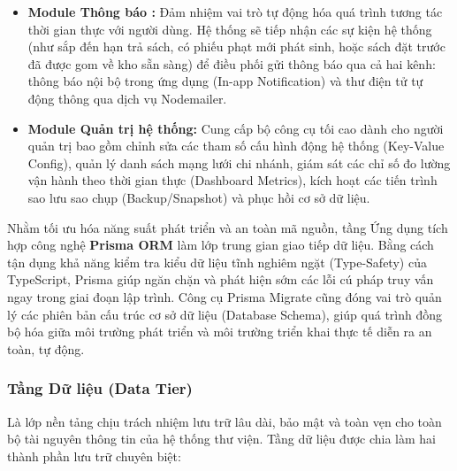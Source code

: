 \begin{itemize}
    \item \textbf{Module Thông báo :} Đảm nhiệm vai trò tự động hóa quá trình tương tác thời gian thực với người dùng. Hệ thống sẽ tiếp nhận các sự kiện hệ thống (như sắp đến hạn trả sách, có phiếu phạt mới phát sinh, hoặc sách đặt trước đã được gom về kho sẵn sàng) để điều phối gửi thông báo qua cả hai kênh: thông báo nội bộ trong ứng dụng (In-app Notification) và thư điện tử tự động thông qua dịch vụ Nodemailer.
    
    \item \textbf{Module Quản trị hệ thống:} Cung cấp bộ công cụ tối cao dành cho người quản trị bao gồm chỉnh sửa các tham số cấu hình động hệ thống (Key-Value Config), quản lý danh sách mạng lưới chi nhánh, giám sát các chỉ số đo lường vận hành theo thời gian thực (Dashboard Metrics), kích hoạt các tiến trình sao lưu sao chụp (Backup/Snapshot) và phục hồi cơ sở dữ liệu.
\end{itemize}

Nhằm tối ưu hóa năng suất phát triển và an toàn mã nguồn, tầng Ứng dụng tích hợp công nghệ \textbf{Prisma ORM} làm lớp trung gian giao tiếp dữ liệu. Bằng cách tận dụng khả năng kiểm tra kiểu dữ liệu tĩnh nghiêm ngặt (Type-Safety) của TypeScript, Prisma giúp ngăn chặn và phát hiện sớm các lỗi cú pháp truy vấn ngay trong giai đoạn lập trình. Công cụ Prisma Migrate cũng đóng vai trò quản lý các phiên bản cấu trúc cơ sở dữ liệu (Database Schema), giúp quá trình đồng bộ hóa giữa môi trường phát triển và môi trường triển khai thực tế diễn ra an toàn, tự động.

\subsubsection{Tầng Dữ liệu (Data Tier)}
Là lớp nền tảng chịu trách nhiệm lưu trữ lâu dài, bảo mật và toàn vẹn cho toàn bộ tài nguyên thông tin của hệ thống thư viện. Tầng dữ liệu được chia làm hai thành phần lưu trữ chuyên biệt:


